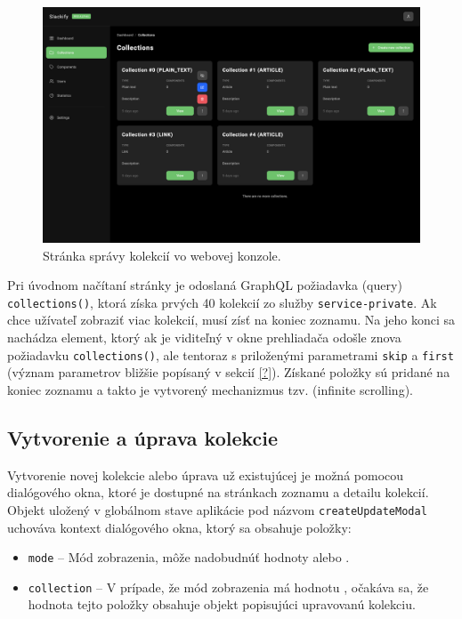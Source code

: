 \begin{figure}[h]
	\centering
	\includegraphics[scale=0.085]{obrazky-figures/screenshot_collections}
	\caption{Stránka správy kolekcií vo webovej konzole.}
\end{figure}

\noindent Pri úvodnom načítaní stránky je odoslaná GraphQL požiadavka (query) \texttt{collections()}, ktorá získa prvých 40 kolekcií zo služby \texttt{service-private}. Ak chce užívateľ zobraziť viac kolekcií, musí zísť na koniec zoznamu. Na jeho konci sa nachádza element, ktorý ak je viditeľný v okne prehliadača odošle znova požiadavku \texttt{collections()}, ale tentoraz s priloženými parametrami \texttt{skip} a \texttt{first} (význam parametrov bližšie popísaný v sekcií \ref{?}). Získané položky sú pridané na koniec zoznamu a takto je vytvorený mechanizmus tzv.  (infinite scrolling).

\subsection{Vytvorenie a úprava kolekcie}
Vytvorenie novej kolekcie alebo úprava už existujúcej je možná pomocou dialógového okna, ktoré je dostupné na stránkach zoznamu a detailu kolekcií. Objekt uložený v globálnom stave aplikácie pod názvom \texttt{createUpdateModal} uchováva kontext dialógového okna, ktorý sa obsahuje položky:

\begin{itemize}
	\item \texttt{mode} -- Mód zobrazenia, môže nadobudnúť hodnoty  alebo .
	\item \texttt{collection} -- V prípade, že mód zobrazenia má hodnotu , očakáva sa, že hodnota tejto položky obsahuje objekt popisujúci upravovanú kolekciu.
\end{itemize}

